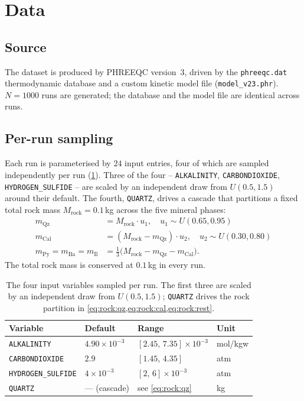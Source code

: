 \section{Data}\label{sec:data}

\subsection{Source}\label{sec:data:source}

The dataset is produced by PHREEQC version~3, driven by the
\texttt{phreeqc.dat} thermodynamic database and a custom kinetic
model file (\texttt{model\_v23.phr}). $N = 1000$ runs are generated;
the database and the model file are identical across runs.

\subsection{Per-run sampling}\label{sec:data:knobs}

Each run is parameterised by $24$ input entries, four of which are
sampled independently per run (\cref{tab:data:knobs}). Three of the
four -- \texttt{ALKALINITY}, \texttt{CARBONDIOXIDE},
\texttt{HYDROGEN\_SULFIDE} -- are scaled by an independent draw from
$U(0.5, 1.5)$ around their default. The fourth, \texttt{QUARTZ},
drives a cascade that partitions a fixed total rock mass
$M_{\text{rock}} = 0.1$\,kg across the five mineral phases:
\begin{align}
m_{\text{Qz}}    &= M_{\text{rock}} \cdot u_1, \quad u_1 \sim U(0.65, 0.95) \label{eq:rock:qz} \\
m_{\text{Cal}}   &= (M_{\text{rock}} - m_{\text{Qz}}) \cdot u_2, \quad u_2 \sim U(0.30, 0.80) \label{eq:rock:cal} \\
m_{\text{Py}} = m_{\text{Ba}} = m_{\text{Il}}
                 &= \tfrac{1}{3}\bigl(M_{\text{rock}} - m_{\text{Qz}} - m_{\text{Cal}}\bigr). \label{eq:rock:rest}
\end{align}
The total rock mass is conserved at $0.1$\,kg in every run.

\begin{table}[ht]
  \centering
  \caption{The four input variables sampled per run. The first three
  are scaled by an independent draw from $U(0.5, 1.5)$;
  \texttt{QUARTZ} drives the rock partition in
  \cref{eq:rock:qz,eq:rock:cal,eq:rock:rest}.}
  \label{tab:data:knobs}
  \begin{tabular}{llll}
    \toprule
    Variable & Default & Range & Unit \\
    \midrule
    \texttt{ALKALINITY}        & $4.90\times10^{-3}$ & $[2.45,\,7.35]\times10^{-3}$ & mol/kgw \\
    \texttt{CARBONDIOXIDE}     & $2.9$               & $[1.45,\,4.35]$              & atm \\
    \texttt{HYDROGEN\_SULFIDE} & $4\times10^{-3}$    & $[2,\,6]\times10^{-3}$       & atm \\
    \texttt{QUARTZ}            & --- (cascade)        & see \cref{eq:rock:qz}        & kg \\
    \bottomrule
  \end{tabular}
\end{table}

